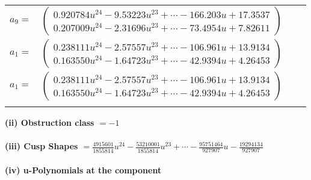 \documentclass[1p]{elsarticle_modified}
\theoremstyle{definition}
\begin{document}
\begin{tabular}{m{7pt} m{180pt} m{7pt} m{180pt} }
\flushright $a_{9}=$&$\begin{pmatrix}0.920784 u^{24}-9.53223 u^{23}+\cdots-166.203 u+17.3537\\0.207009 u^{24}-2.31696 u^{23}+\cdots-73.4954 u+7.82611\end{pmatrix}$ \\
\flushright $a_{1}=$&$\begin{pmatrix}0.238111 u^{24}-2.57557 u^{23}+\cdots-106.961 u+13.9134\\0.163550 u^{24}-1.64723 u^{23}+\cdots-42.9394 u+4.26453\end{pmatrix}$\\ \flushright $a_{1}=$&$\begin{pmatrix}0.238111 u^{24}-2.57557 u^{23}+\cdots-106.961 u+13.9134\\0.163550 u^{24}-1.64723 u^{23}+\cdots-42.9394 u+4.26453\end{pmatrix}$\\&\end{tabular}
\flushleft \textbf{(ii) Obstruction class $= -1$}\\~\\
\flushleft \textbf{(iii) Cusp Shapes $= \frac{4915601}{1855814} u^{24}-\frac{53210001}{1855814} u^{23}+\cdots-\frac{95751464}{927907} u-\frac{19294134}{927907}$}\\~\\
\newpage\renewcommand{\arraystretch}{1}
\flushleft \textbf{(iv) u-Polynomials at the component}\newline \\
\end{document}
